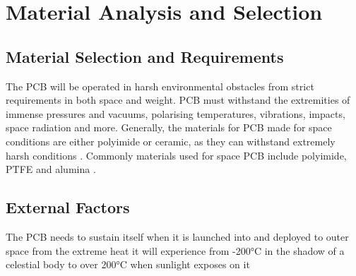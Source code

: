 \section{Material Analysis and Selection}


\subsection{Material Selection and Requirements}
The PCB will be operated in harsh environmental obstacles from strict 
requirements in both space and weight. PCB must withstand the extremities 
of immense pressures and vacuums, polarising temperatures, vibrations, 
impacts, space radiation and more. Generally, the materials for PCB made 
for space conditions are either polyimide or ceramic, as they can withstand 
extremely harsh conditions \cite{RefWorks:leverett2024satellite}. Commonly materials used for 
space PCB include polyimide, PTFE and alumina \cite{RefWorks:2025applying}.

\subsection{External Factors}
The PCB needs to sustain itself when it is launched into and deployed to 
outer space from the extreme heat it will experience from -200°C in the 
shadow of a celestial body to over 200°C when sunlight exposes on it 

